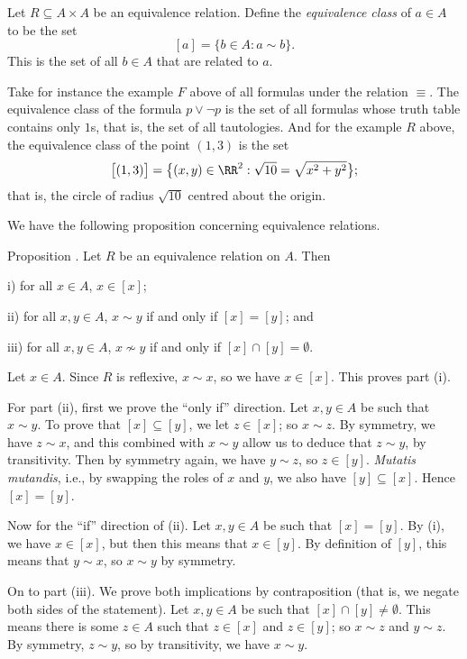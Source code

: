 Let $R\subseteq A\times A$ be an equivalence relation. Define the {\it equivalence class} of $a\in A$
to be the set
$$[a] = \{b\in A : a\sim b\}.$$
This is the set of all $b\in A$ that are related to $a$.

Take for instance the example $F$ above of all formulas under the relation $\equiv$. The equivalence class
of the formula $p\vee\neg p$ is the set of all formulas whose truth table contains only $1$s, that is,
the set of all tautologies.
And for the example $R$ above, the
equivalence class of the point $(1,3)$ is the set
$$\bigl[ (1,3)\bigr] = \bigl\{ (x,y)\in \RR^2 : \sqrt{10}= \sqrt{x^2 + y^2}\bigr\};$$
that is, the circle of radius $\sqrt{10}$ centred about the origin.

We have the following proposition concerning equivalence relations.

\proclaim Proposition \advthm. Let $R$ be an equivalence relation on $A$. Then
\medskip
\item{i)} for all $x\in A$, $x\in [x]$;
\smallskip
\item{ii)} for all $x,y\in A$, $x\sim y$ if and only if $[x] = [y]$; and
\smallskip
\item{iii)} for all $x,y\in A$, $x\not\sim y$ if and only if $[x] \cap [y] =  \emptyset$.
\medskip

\proof Let $x\in A$. Since $R$ is reflexive, $x\sim x$, so we have $x\in [x]$. This proves part (i).

For part (ii), first we prove the ``only if'' direction. Let $x,y\in A$ be such that $x\sim y$. To prove that
$[x]\subseteq [y]$, we let $z\in [x]$; so $x\sim z$. By symmetry, we have $z\sim x$, and this
combined with $x\sim y$ allow us to deduce that $z\sim y$, by transitivity. Then by symmetry again,
we have $y\sim z$, so $z\in [y]$. {\it Mutatis mutandis}, i.e., by swapping the roles of $x$ and $y$,
we also have $[y]\subseteq [x]$. Hence $[x] = [y]$.

Now for the ``if'' direction of (ii). Let $x,y\in A$ be such that
$[x] = [y]$. By (i), we have $x\in [x]$, but
then this means that $x\in [y]$. By definition of $[y]$, this means that $y\sim x$, so $x\sim y$
by symmetry.

On to part (iii). We prove both implications by contraposition (that is, we negate both sides of the
statement). Let $x,y\in A$ be such that $[x]\cap [y] \ne \emptyset$. This means there is some $z\in A$ such
that $z\in [x]$ and $z\in [y]$; so $x\sim z$ and $y\sim z$. By symmetry, $z\sim y$,
so by transitivity, we have $x\sim y$.


